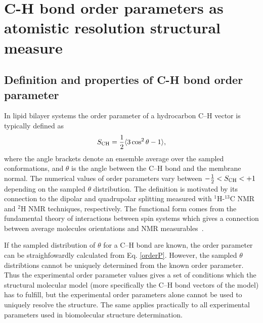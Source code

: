 \documentclass[aps,prl,superscriptaddress,twocolumn]{revtex4}
\begin{document}
\section{C-H bond order parameters as atomistic resolution structural measure}

\subsection{Definition and properties of C-H bond order parameter}\label{OPdefinition}
In lipid bilayer systems the order parameter of a hydrocarbon C--H vector is typically defined as 
\begin{equation}\label{orderP}
S_{{\rm CH}}=\frac{1}{2}\langle 3 \cos^2 \theta-1 \rangle,
\end{equation} 
where the angle brackets denote an ensemble average over the sampled conformations, and $\theta$ is the 
angle between the C--H bond and the membrane normal.
The numerical values of order parameters vary between $-\frac{1}{2} < S_{{\rm CH}} < +1$
depending on the sampled $\theta$ distribution.
The definition is motivated by its connection to the dipolar and quadrupolar splitting measured with
$^1$H-$^{13}$C NMR and $^2$H NMR techniques, respectively. The functional form comes from 
the fundamental theory of interactions between spin systems which gives a connection between 
average molecules orientations and NMR measurables~\cite{abragam}. 

If the sampled distribution of $\theta$ for a C--H bond are known, the order parameter
can be straighfowardly calculated from Eq. \ref{orderP}. However, the sampled $\theta$ 
distribtions cannot be uniquely determined from the known order parameter. Thus the experimental
order parameter values gives a set of conditions which the structural molecular model 
(more specifically the C--H bond vectors of the model) has to fulfill,
but the experimental order parameters alone cannot be used to uniquely 
resolve the structure. The same applies practically to all
experimental parameters used in biomolecular structure determination. 
\end{document}
